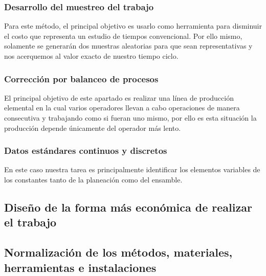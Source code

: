     
    
    \subsubsection{Desarrollo del muestreo del trabajo}
    Para este método, el principal objetivo es usarlo como herramienta para disminuir el costo que representa un estudio de tiempos convencional. Por ello mismo, solamente se generarán dos muestras aleatorias para que sean representativas y nos acerquemos al valor exacto de nuestro tiempo ciclo.
    
    
    
    
    
    \subsubsection{Corrección por balanceo de procesos}
    
    El principal objetivo de este apartado es realizar una línea de producción elemental en la cual varios operadores llevan a cabo operaciones de manera consecutiva y trabajando como si fueran uno mismo, por ello es esta situación la producción depende únicamente del operador más lento.
    
    
    
    \subsubsection{Datos estándares continuos y discretos}
    
    En este caso nuestra tarea es principalmente identificar los elementos variables de los constantes tanto de la planeación como del ensamble. 
    
    
    \subsection{Diseño de la forma más económica de realizar el trabajo}
    
    \subsection{Normalización de los métodos, materiales, herramientas e instalaciones}
    
